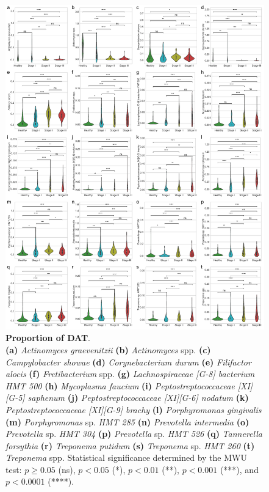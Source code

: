 \documentclass[11pt, a4paper, onecolumn, oneside]{report}
\begin{document}
            \begin{figure}[p]
                \centering
                \includegraphics[width=0.9 \linewidth]{Figures/Periodontitis/Figure_R04.pdf}
                \caption[Proportion of DAT]{\textbf{Proportion of DAT}. \\
                    \textbf{(a)} \textit{Actinomyces graevenitzii} \textbf{(b)} \textit{Actinomyces} spp. \textbf{(c)} \textit{Campylobacter showae} \textbf{(d)} \textit{Corynebacterium durum} \textbf{(e)} \textit{Filifactor alocis} \textbf{(f)} \textit{Fretibacterium} spp. \textbf{(g)} \textit{Lachnospiraceae [G-8] bacterium HMT 500} \textbf{(h)} \textit{Mycoplasma faucium} \textbf{(i)} \textit{Peptostreptococcaceae [XI][G-5] saphenum} \textbf{(j)} \textit{Peptostreptococcaceae [XI][G-6] nodatum} \textbf{(k)} \textit{Peptostreptococcaceae [XI][G-9] brachy} \textbf{(l)} \textit{Porphyromonas gingivalis} \textbf{(m)} \textit{Porphyromonas} sp. \textit{HMT 285} \textbf{(n)} \textit{Prevotella intermedia} \textbf{(o)} \textit{Prevotella} sp. \textit{HMT 304} \textbf{(p)} \textit{Prevotella} sp. \textit{HMT 526} \textbf{(q)} \textit{Tannerella forsythia} \textbf{(r)} \textit{Treponema putidum} \textbf{(s)} \textit{Treponema} sp. \textit{HMT 260} \textbf{(t)} \textit{Treponema} spp. Statistical significance determined by the MWU test: $p \ge 0.05$ (ns), $p < 0.05$ (*), $p < 0.01$ (**), $p < 0.001$ (***), and $p < 0.0001$ (****).}
                \label{fig:Periodontitis-proportions}
            \end{figure}
            \clearpage
\end{document}
